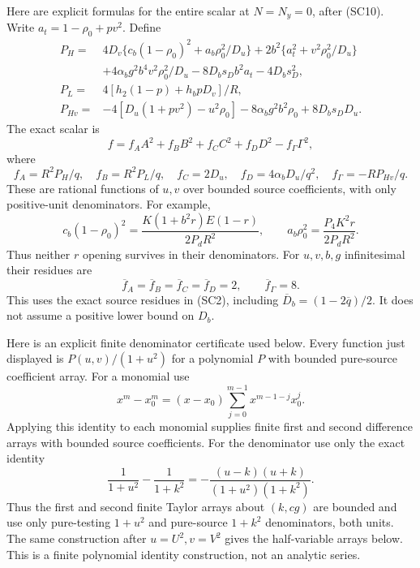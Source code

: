 Here are explicit formulas for the entire scalar at $N=N_y=0$,
after (SC10). Write $a_t=1-\rho_0+pv^2$. Define
\begin{align*}
 P_H={}&4D_v\{c_b(1-\rho_0)^2+a_b\rho_0^2/D_u\}
       +2b^2\{a_t^2+v^2\rho_0^2/D_u\}\\
 &+4\alpha_bg^2b^4v^2\rho_0^2/D_u
       -8D_bs_Db^2a_t-4D_bs_D^2,\\
 P_L={}&4[h_2(1-p)+h_bpD_v]/R,\\
 P_{Hv}={}&-4[D_u(1+pv^2)-u^2\rho_0]
             -8\alpha_bg^2b^2\rho_0+8D_bs_DD_u.
\end{align*}
The exact scalar is
\[
 f=f_AA^2+f_BB^2+f_CC^2+f_DD^2-f_\Gamma\Gamma^2,
 \tag{SC12}
\]
where
\[
 f_A=R^2P_H/q,\quad f_B=R^2P_L/q,\quad
 f_C=2D_u,\quad f_D=4\alpha_bD_u/q^2,
 \quad f_\Gamma=-RP_{Hv}/q.
\]
These are rational functions of $u,v$ over bounded source coefficients,
with only positive-unit denominators. For example,
\[
 c_b(1-\rho_0)^2=
   \frac{K(1+b^2r)E(1-r)}{2P_dR^2},\qquad
 a_b\rho_0^2=\frac{P_4K^2r}{2P_dR^2}.
\]
Thus neither $r$ opening survives in their denominators.
For $u,v,b,g$ infinitesimal their residues are
\[
               \overline f_A=\overline f_B=
 \overline f_C=\overline f_D=2,\qquad
               \overline f_\Gamma=8.               \tag{SC13}
\]
This uses the exact source residues in (SC2), including
$\overline D_b=(1-2\overline q)/2$. It does not assume a positive
lower bound on $D_b$.

Here is an explicit finite denominator certificate used below.
Every function just displayed is $P(u,v)/(1+u^2)$ for a polynomial
$P$ with bounded pure-source coefficient array. For a monomial use
\[
 x^m-x_0^m=(x-x_0)\sum_{j=0}^{m-1}x^{m-1-j}x_0^j.
\]
Applying this identity to each monomial supplies finite first and
second difference arrays with bounded source coefficients. For the
denominator use only the exact identity
\[
 \frac1{1+u^2}-\frac1{1+k^2}
 =-\frac{(u-k)(u+k)}{(1+u^2)(1+k^2)}.
\]
Thus the first and second finite Taylor arrays about $(k,cg)$
are bounded and use only pure-testing $1+u^2$ and pure-source
$1+k^2$ denominators, both units. The same construction after
$u=U^2,v=V^2$ gives the half-variable arrays below. This is a
finite polynomial identity construction, not an analytic series.

